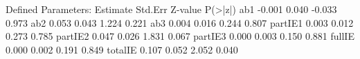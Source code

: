 \begin{Schunk}
\begin{Soutput}
Defined Parameters:
                   Estimate  Std.Err  Z-value  P(>|z|)
    ab1              -0.001    0.040   -0.033    0.973
    ab2               0.053    0.043    1.224    0.221
    ab3               0.004    0.016    0.244    0.807
    partIE1           0.003    0.012    0.273    0.785
    partIE2           0.047    0.026    1.831    0.067
    partIE3           0.000    0.003    0.150    0.881
    fullIE            0.000    0.002    0.191    0.849
    totalIE           0.107    0.052    2.052    0.040
\end{Soutput}
\end{Schunk}

